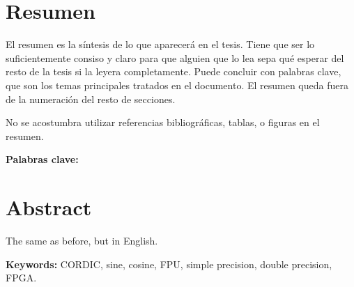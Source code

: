 \chapter*{Resumen}
\thispagestyle{empty}

El resumen es la síntesis de lo que aparecerá en el tesis. Tiene que ser lo
suficientemente consiso y claro para que alguien que lo lea sepa qué esperar
del resto de la tesis si la leyera completamente. Puede concluir con palabras
clave, que son los temas principales tratados en el documento. El resumen queda
fuera de la numeración del resto de secciones.

No se acostumbra utilizar referencias bibliográficas, tablas, o figuras
en el resumen.

\bigskip

\textbf{Palabras clave:} \scriptKeywords

\clearpage
\chapter*{Abstract}
\thispagestyle{empty}

The same as before, but in English.

\bigskip

\textbf{Keywords:} CORDIC, sine, cosine, FPU, simple precision, double precision, FPGA. 

\cleardoublepage

